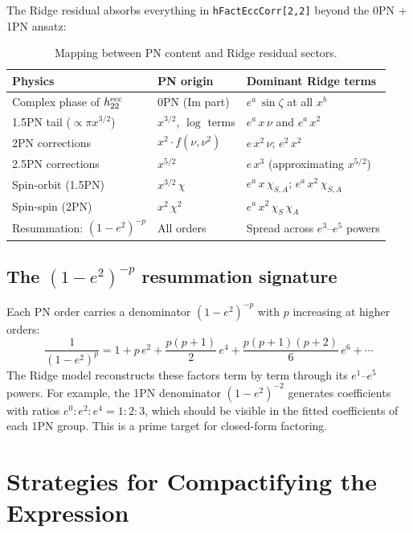 \documentclass[11pt,letterpaper]{article}
\newcommand{\chiS}{\chi_S}
\newcommand{\chiA}{\chi_A}
\begin{document}
The Ridge residual absorbs everything in \texttt{hFactEccCorr[2,2]} beyond the 0PN + 1PN ansatz:

\begin{table}[H]
\centering
\caption{Mapping between PN content and Ridge residual sectors.}
\label{tab:pn_map}
\begin{tabular}{@{}p{4.8cm}p{3.2cm}p{5cm}@{}}
\toprule
Physics & PN origin & Dominant Ridge terms \\
\midrule
Complex phase of $h_{22}^{\rm ecc}$ & 0PN (Im part) & $e^a\,\sin\zeta$ at all $x^b$ \\
1.5PN tail ($\propto \pi x^{3/2}$) & $x^{3/2}$, $\log$ terms & $e^a\, x\, \nu$ and $e^a\, x^2$ \\
2PN corrections & $x^2 \cdot f(\nu, \nu^2)$ & $e\, x^2\, \nu$; $e^2\, x^2$ \\
2.5PN corrections & $x^{5/2}$ & $e\, x^3$ (approximating $x^{5/2}$) \\
Spin-orbit (1.5PN) & $x^{3/2}\,\chi$ & $e^a\, x\, \chi_{S,A}$; $e^a\, x^2\, \chi_{S,A}$ \\
Spin-spin (2PN) & $x^2\,\chi^2$ & $e^a\, x^2\, \chiS\,\chiA$ \\
Resummation: $(1-e^2)^{-p}$ & All orders & Spread across $e^3$--$e^5$ powers \\
\bottomrule
\end{tabular}
\end{table}

\subsection{The $(1-e^2)^{-p}$ resummation signature}

Each PN order carries a denominator $(1-e^2)^{-p}$ with $p$ increasing at higher orders:
\begin{equation}
\frac{1}{(1-e^2)^p} = 1 + p\,e^2 + \frac{p(p+1)}{2}\,e^4 + \frac{p(p+1)(p+2)}{6}\,e^6 + \cdots
\label{eq:1me2}
\end{equation}
The Ridge model reconstructs these factors term by term through its $e^1$--$e^5$ powers. For example, the 1PN denominator $(1-e^2)^{-2}$ generates coefficients with ratios $e^0 : e^2 : e^4 = 1 : 2 : 3$, which should be visible in the fitted coefficients of each 1PN group. This is a prime target for closed-form factoring.

\section{Strategies for Compactifying the Expression}
\label{sec:compact}
\end{document}
